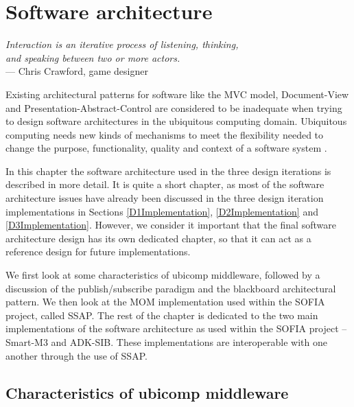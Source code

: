 \chapter{Software architecture}
\label{SoftwareArchitecture}

\begin{flushright}{\slshape    
Interaction is an iterative process of listening, thinking, \\
and speaking between two or more actors.} \\ \medskip
    --- Chris Crawford, game designer
\end{flushright}


Existing architectural patterns for software like the \ac{MVC} model, Document-View and Presentation-Abstract-Control are considered to be inadequate when trying to design software architectures in the ubiquitous computing domain. Ubiquitous computing needs new kinds of mechanisms to meet the flexibility needed to change the purpose, functionality, quality and context of a software system \cite{Niemela2004}.

In this chapter the software architecture used in the three design iterations is described in more detail. It is quite a short chapter, as most of the software architecture issues have already been discussed in the three design iteration implementations in Sections \ref{D1Implementation}, \ref{D2Implementation} and \ref{D3Implementation}. However, we consider it important that the final software architecture design has its own dedicated chapter, so that it can act as a reference design for future implementations.

We first look at some characteristics of ubicomp middleware, followed by a discussion of the publish/subscribe paradigm and the blackboard architectural pattern. We then look at the \ac{MOM} implementation used within the \ac{SOFIA} project, called \ac{SSAP}. The rest of the chapter is dedicated to the two main implementations of the software architecture as used within the \ac{SOFIA} project -- Smart-M3 and ADK-SIB. These implementations are interoperable with one another through the use of \ac{SSAP}.


\section{Characteristics of ubicomp middleware}

